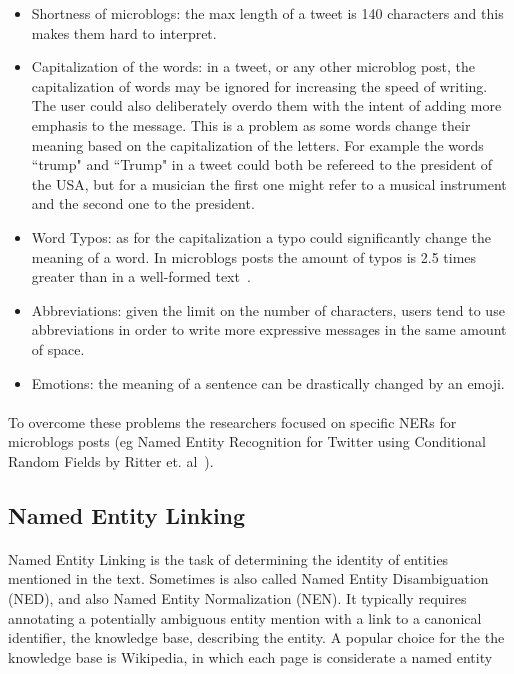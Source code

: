 \begin{itemize}[itemsep = 0.1em]
\item Shortness of microblogs: the max length of a tweet is 140 characters and this makes them hard to interpret.
\item Capitalization of the words: in a tweet, or any other microblog post, the capitalization of words may be ignored for increasing the speed of writing. The user could also deliberately overdo them with the intent of adding more emphasis to the message. This is a problem as some words change their meaning based on the capitalization of the letters. For example the words ``trump" and ``Trump" in a tweet could both be refereed to the president of the USA, but for a musician the first one might refer to a musical instrument and the second one to the president.
\item Word Typos: as for the capitalization a typo could significantly change the meaning of a word. In microblogs posts the amount of typos is 2.5 times greater than in a well-formed text~\cite{derczynski2015analysis}.
\item Abbreviations: given the limit on the number of characters, users tend to use abbreviations in order to write more expressive messages in the same amount of space.
\item Emotions: the meaning of a sentence can be drastically changed by an emoji. 
\end{itemize}

\paragraph{}
To overcome these problems the researchers focused on specific NERs for microblogs posts (eg Named Entity Recognition for Twitter using Conditional Random Fields by Ritter et. al~\cite{ritter2011named}).

\subsection{Named Entity Linking}
\paragraph{}
Named Entity Linking is the task of determining the identity of entities mentioned in the text. Sometimes is also called Named Entity Disambiguation (NED), and also Named Entity Normalization (NEN). It typically requires annotating a potentially ambiguous entity mention with a link to a canonical identifier, the knowledge base, describing the entity. A popular choice for the the knowledge base is Wikipedia, in which each page is considerate a named entity 

